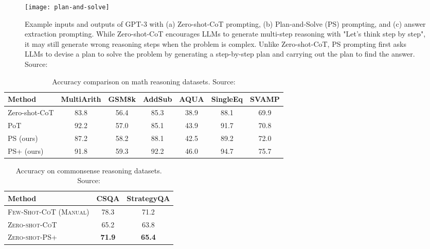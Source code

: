 \begin{figure}[h!]
	\centering
	\texttt{[image: plan-and-solve]}
	\caption{Example inputs and outputs of GPT-3 with (a) Zero-shot-CoT prompting, (b) Plan-and-Solve (PS) prompting, and (c) answer extraction prompting. While Zero-shot-CoT encourages LLMs to generate multi-step reasoning with "Let’s think step by step", it may still generate wrong reasoning steps when the problem is complex. Unlike Zero-shot-CoT, PS prompting first asks LLMs to devise a plan to solve the problem by generating a step-by-step plan and carrying out the plan to find the answer. Source: \textcite{wang2023plan}}
	\label{fig:plan-and-solve}
\end{figure}

\begin{table}[h!]
	\centering
	\begin{tabularx}{\textwidth}{Xcccccc}
		\hline
		\textbf{Method} & \textbf{MultiArith} & \textbf{GSM8k} & \textbf{AddSub} & \textbf{AQUA} & \textbf{SingleEq} & \textbf{SVAMP} \\
		\hline
		Zero-shot-CoT   & 83.8                & 56.4           & 85.3            & 38.9          & 88.1              & 69.9           \\
		PoT             & 92.2                & 57.0           & 85.1            & 43.9          & 91.7              & 70.8           \\
		PS (ours)       & 87.2                & 58.2           & 88.1            & 42.5          & 89.2              & 72.0           \\
		PS+ (ours)      & 91.8                & 59.3           & 92.2            & 46.0          & 94.7              & 75.7           \\
		\hline
	\end{tabularx}
	\caption{Accuracy comparison on math reasoning datasets. Source: \textcite{wang2023plan}}
	\label{tab:ps-math-accuracy}
\end{table}

\begin{table}[h!]
	\centering
	\begin{tabularx}{\textwidth}{Xcc}
		\hline
		\textbf{Method}                & \textbf{CSQA} & \textbf{StrategyQA} \\ \hline
		\textsc{Few-Shot-CoT (Manual)} & 78.3          & 71.2                \\
		\textsc{Zero-shot-CoT}         & 65.2          & 63.8                \\
		\textsc{Zero-shot-PS+}         & \textbf{71.9} & \textbf{65.4}       \\ \hline
	\end{tabularx}
	\caption{Accuracy on commonsense reasoning datasets. Source: \textcite{wang2023plan}}
	\label{tab:commonsense_reasoning}
\end{table}

